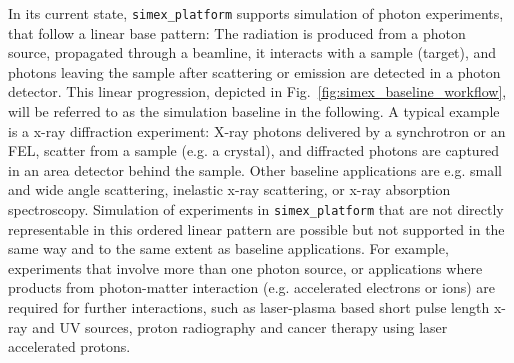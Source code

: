 \documentclass[12pt]{scrartcl}
\begin{document}
In its current state, \texttt{simex\_platform} supports simulation of
photon experiments, that follow a linear base pattern: The radiation is produced
from a photon source, propagated through a beamline, it interacts with a sample
(target), and photons leaving the sample after scattering or emission are
detected in a photon detector. This linear progression, depicted in
Fig.~\ref{fig:simex_baseline_workflow}, will be referred to as
the simulation  baseline in the following. A typical example is a x-ray diffraction
experiment: X-ray photons delivered by a synchrotron or an FEL, scatter from a
sample (e.g. a crystal), and diffracted photons are captured in
an area detector behind the sample. Other baseline applications are e.g. small
and wide angle scattering, inelastic x-ray scattering, or x-ray absorption
spectroscopy. Simulation of experiments in \texttt{simex\_platform} that are not directly
representable in this ordered linear pattern are possible but not supported in the same way and
to the same extent as baseline applications. For example,
experiments that involve more than one photon source, or applications where
products from photon-matter interaction (e.g. accelerated electrons or ions) are
required for further interactions, such as laser-plasma based short pulse length x-ray and UV sources,
proton radiography and cancer therapy using laser accelerated protons.
\end{document}
